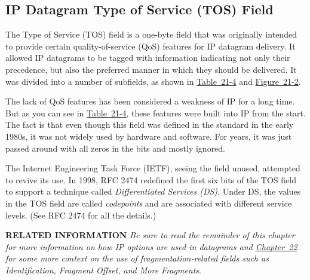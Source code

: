 \documentclass[b5paper,11pt]{memoir}
\begin{document}
\subsection[IP Datagram Type of Service (TOS)
Field]{\texorpdfstring{\protect\hypertarget{ch21s02.htmlux5cux23ip_datagram_type_of_service_tos_field}{}{}IP
Datagram Type of Service (TOS)
Field}{IP Datagram Type of Service (TOS) Field}}

\protect\hypertarget{ch21s02.htmlux5cux23idx-CHP-21-0784}{}{}\protect\hypertarget{ch21s02.htmlux5cux23idx-CHP-21-0785}{}{}The
\protect\hypertarget{ch21s02.htmlux5cux23idx-CHP-21-0786}{}{}Type of
Service (TOS) field is a one-byte field that was originally intended to
provide certain quality-of-service (QoS) features for IP datagram
delivery. It allowed IP datagrams to be tagged with information
indicating not only their precedence, but also the preferred manner in
which they should be delivered. It was divided into a number of
subfields, as shown in
\protect\hyperlink{ch21s02.htmlux5cux23original_definition_of_ipv_type_of_servi}{Table~21-4}
and
\protect\hyperlink{ch21s02.htmlux5cux23ipv4_datagram_format_this_diagram_shows_}{Figure~21-2}.

The lack of QoS features has been considered a weakness of IP for a long
time. But as you can see in
\protect\hyperlink{ch21s02.htmlux5cux23original_definition_of_ipv_type_of_servi}{Table~21-4},
these features were built into IP from the start. The fact is that even
though this field was defined in the standard in the early 1980s, it was
not widely used by hardware and software. For years, it was just passed
around with all zeros in the bits and mostly ignored.

The Internet Engineering Task Force (IETF), seeing the field unused,
attempted to revive its use. In 1998, RFC 2474 redefined the first six
bits of the TOS field to support a technique called
\protect\hypertarget{ch21s02.htmlux5cux23idx-CHP-21-0787}{}{}{\emph{Differentiated
Services (DS)}}. Under DS, the values in the TOS field are called
{\emph{codepoints}} and are associated with different service levels.
(See RFC 2474 for all the details.)


{\textbf{RELATED INFORMATION}} {\emph{Be sure to read the remainder of
this chapter for more information on how IP options are used in
datagrams and \protect\hyperlink{ch22.html}{Chapter~22} for some more
context on the use of fragmentation-related fields such as
Identification, Fragment Offset, and More Fragments}}.

\protect\hypertarget{ch21s02.htmlux5cux23original_definition_of_ipv_type_of_servi}{}{}
\end{document}
